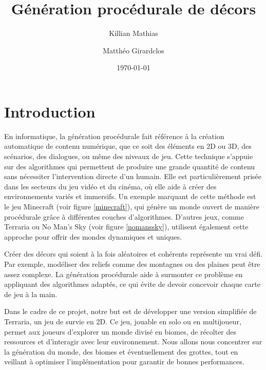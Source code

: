 \documentclass[12pt]{article}
\author{Killian Mathias}{I}
\author{Matthéo Girardclos}{II}
\title{Génération procédurale de décors}
\date{\today}
\begin{document}
\maketitle
\newpage

\tableofcontents
\newpage

\section{Introduction}

En informatique, la génération procédurale fait référence à la création automatique de contenu numérique, que ce soit des éléments en 2D ou 3D, des scénarios, des dialogues, ou même des niveaux de jeu. Cette technique s'appuie sur des algorithmes qui permettent de produire une grande quantité de contenu sans nécessiter l'intervention directe d'un humain. Elle est particulièrement prisée dans les secteurs du jeu vidéo et du cinéma, où elle aide à créer des environnements variés et immersifs.  Un exemple marquant de cette méthode est le jeu Minecraft (voir figure \ref{minecraft}), qui génère un monde ouvert de manière procédurale grâce à différentes couches d'algorithmes. D'autres jeux, comme Terraria ou No Man’s Sky (voir figure \ref{nomanssky}), utilisent également cette approche pour offrir des mondes dynamiques et uniques.\par
Créer des décors qui soient à la fois aléatoires et cohérents représente un vrai défi. Par exemple, modéliser des reliefs comme des montagnes ou des plaines peut être assez complexe. La génération procédurale aide à surmonter ce problème en appliquant des algorithmes adaptés, ce qui évite de devoir concevoir chaque carte de jeu à la main.\par
Dans le cadre de ce projet, notre but est de développer une version simplifiée de Terraria, un jeu de survie en 2D. Ce jeu, jouable en solo ou en multijoueur, permet aux joueurs d'explorer un monde divisé en biomes, de récolter des ressources et d'interagir avec leur environnement. Nous allons nous concentrer sur la génération du monde, des biomes et éventuellement des grottes, tout en veillant à optimiser l'implémentation pour garantir de bonnes performances.
\end{document}

